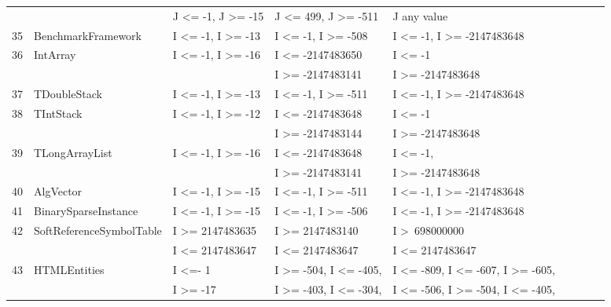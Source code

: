 {\begin{longtable}{|l|l|l|l|l|l|l|l|l|}
	&                                             & J \textless= -1, J \textgreater= -15			& J \textless= 499, J \textgreater= -511	& J any value			 		  				\\	
35	& BenchmarkFramework		& I \textless= -1, I \textgreater= -13			& I \textless= -1, I \textgreater= -508		& I \textless= -1, I \textgreater= -2147483648	\\ 
36	& IntArray					& I \textless= -1, I \textgreater= -16			& I \textless= -2147483650				& I \textless= -1								\\ 
	&							&											& I \textgreater= -2147483141			&  I \textgreater= -2147483648				\\
37	& TDoubleStack				& I \textless= -1, I \textgreater= -13			& I \textless= -1, I \textgreater= -511		& I \textless= -1, I \textgreater= -2147483648	\\ 
38	& TIntStack					& I \textless= -1, I \textgreater= -12			& I \textless= -2147483648		 		& I \textless= -1 							\\ 
	&							&											& I \textgreater= -2147483144			& I \textgreater= -2147483648				\\
39	& TLongArrayList				& I \textless= -1, I \textgreater= -16			& I \textless= -2147483648 				& I \textless= -1, 							\\ 
	&							&											& I \textgreater= -2147483141			& I \textgreater= -2147483648				\\
40	& AlgVector					& I \textless= -1, I \textgreater= -15			& I \textless= -1, I \textgreater= -511		& I \textless= -1, I \textgreater= -2147483648	\\ 
41	& BinarySparseInstance		& I \textless= -1, I \textgreater= -15			& I \textless= -1, I \textgreater= -506		& I \textless= -1, I \textgreater= -2147483648	\\ 
42	& SoftReferenceSymbolTable	& I \textgreater= 2147483635				& I \textgreater= 2147483140			& I \textgreater~698000000					\\ 
	&                                             & I \textless= 2147483647					& I \textless= 2147483647				&  I \textless= 2147483647					\\
43	& HTMLEntities				& I \textless=- 1								& I \textgreater= -504, I \textless= -405,	&  I \textless= -809, I \textless= -607, I \textgreater= -605,    		\\ 
	&                         			& I \textgreater= -17							& I \textgreater= -403, I \textless= -304, 	&  I \textless= -506, I \textgreater= -504, I \textless= -405,		 \\	

\end{longtable}}
